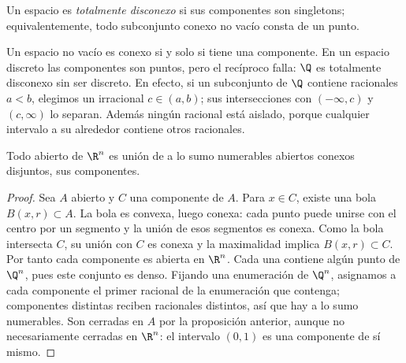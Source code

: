 \begin{definicion}
Un espacio es \emph{totalmente disconexo} si sus componentes son singletons; equivalentemente, todo subconjunto conexo no vacío consta de un punto.
\end{definicion}
Un espacio no vacío es conexo si y solo si tiene una componente. En un espacio discreto las componentes son puntos, pero el recíproco falla: $\Q$ es totalmente disconexo sin ser discreto. En efecto, si un subconjunto de $\Q$ contiene racionales $a<b$, elegimos un irracional $c\in(a,b)$; sus intersecciones con $(-\infty,c)$ y $(c,\infty)$ lo separan. Además ningún racional está aislado, porque cualquier intervalo a su alrededor contiene otros racionales.

\begin{proposicion}\label{ch18:abiertosEuclideos}
Todo abierto de $\R^n$ es unión de a lo sumo numerables abiertos conexos disjuntos, sus componentes.
\end{proposicion}
\begin{proof}
Sea $A$ abierto y $C$ una componente de $A$. Para $x\in C$, existe una bola $B(x,r)\subset A$. La bola es convexa, luego conexa: cada punto puede unirse con el centro por un segmento y la unión de esos segmentos es conexa. Como la bola intersecta $C$, su unión con $C$ es conexa y la maximalidad implica $B(x,r)\subset C$. Por tanto cada componente es abierta en $\R^n$. Cada una contiene algún punto de $\Q^n$, pues este conjunto es denso. Fijando una enumeración de $\Q^n$, asignamos a cada componente el primer racional de la enumeración que contenga; componentes distintas reciben racionales distintos, así que hay a lo sumo numerables. Son cerradas en $A$ por la proposición anterior, aunque no necesariamente cerradas en $\R^n$: el intervalo $(0,1)$ es una componente de sí mismo.
\end{proof}

